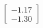 \documentclass[preview]{standalone}
\begin{document}
\begin{align*}
\begin{bmatrix} -1.17 \\ -1.30 \end{bmatrix}
\end{align*}
\end{document}
